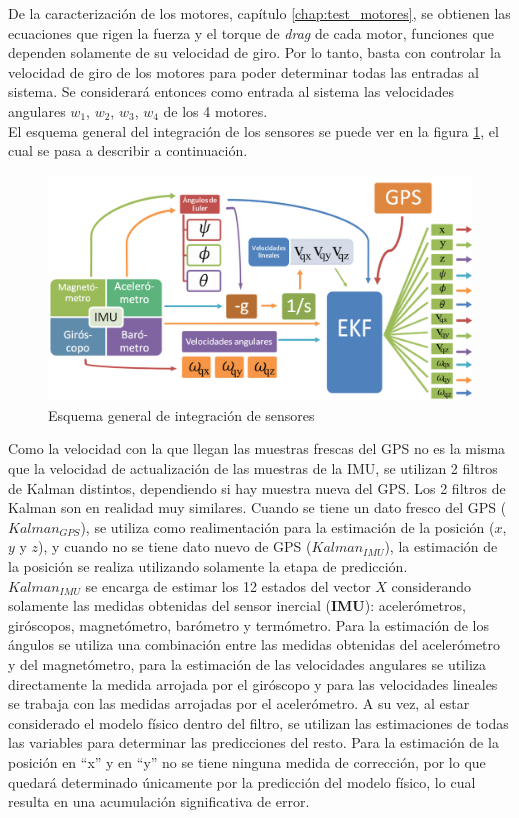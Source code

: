 \documentclass[main]{subfiles}
\begin{document}
De la caracterización de los motores, capítulo \ref{chap:test_motores}, se obtienen las ecuaciones que rigen la fuerza y el torque de \emph{drag} de cada motor, funciones que dependen solamente de su velocidad de giro. Por lo tanto, basta con controlar la velocidad de giro de los motores para poder determinar todas las entradas al sistema. Se considerará entonces como entrada al sistema las velocidades angulares $w_1$, $w_2$, $w_3$, $w_4$ de los 4 motores.\\

El esquema general del integración de los sensores se puede ver en la figura \ref{fig:diagrama_kalman}, el cual se pasa a describir a continuación.\\

\begin{figure}[h!]
	\centering
	\includegraphics[width=.8\textwidth]{./pics_kalman/diagrama_kalman_2.png}
	\caption{Esquema general de integración de sensores}
	\label{fig:diagrama_kalman}
\end{figure}

Como la velocidad con la que llegan las muestras frescas del GPS no es la misma que la velocidad de actualización de las muestras de la IMU, se utilizan 2 filtros de Kalman distintos, dependiendo si hay muestra nueva del GPS. Los 2 filtros de Kalman son en realidad muy similares. Cuando se tiene un dato fresco del GPS ($Kalman_{GPS}$), se utiliza como realimentación para la estimación de la posición ($x$, $y$ y $z$), y cuando no se tiene dato nuevo de GPS ($Kalman_{IMU}$), la estimación de la posición se realiza utilizando solamente la etapa de predicción.\\

$Kalman_{IMU}$ se encarga de estimar los 12 estados del vector $X$ considerando solamente las medidas obtenidas del sensor inercial (\textbf{IMU}): acelerómetros, giróscopos, magnetómetro, barómetro y termómetro. Para la estimación de los ángulos se utiliza una combinación entre las medidas obtenidas del acelerómetro y del magnetómetro, para la estimación de las velocidades angulares se utiliza directamente la medida arrojada por el giróscopo y para las velocidades lineales se trabaja con las medidas arrojadas por el acelerómetro. A su vez, al estar considerado el modelo físico dentro del filtro, se utilizan las estimaciones de todas las variables para determinar las predicciones del resto. Para la estimación de la posición en ``x'' y en ``y'' no se tiene ninguna medida de corrección, por lo que quedará determinado únicamente por la predicción del modelo físico, lo cual resulta en una acumulación significativa de error.\\
\end{document}
